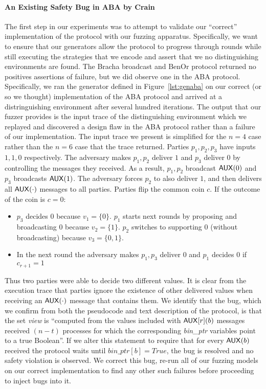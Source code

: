 \paragraph{An Existing Safety Bug in ABA by Crain~\cite{aba}}
The first step in our experiments was to attempt to validate our ``correct''
implementation of the protocol with our fuzzing apparatus.  Specifically, we
want to ensure that our generators allow the protocol to progress through
rounds while still executing the strategies that we encode and assert that we
no distinguishing environments are found.  The Bracha broadcast and BenOr
protocol returned no positives assertions of failure, but we did observe one in
the ABA protocol.  Specifically, we ran the generator defined in
Figure~\ref{lst:genaba} on our correct (or so we thought) implementation of the
ABA protocol and arrived at a distringuishing environment after several hundred
iterations.  The output that our fuzzer provides is the input trace of the
distinguishing environment which we replayed and discovered a design flaw in
the ABA protocol rather than a failure of our implementation.  The input trace
we present is simplified for the $n=4$ case rather than the $n=6$ case that the
trace returned.  Parties $p_1, p_2, p_3$ have inputs $1, 1, 0$ respectively.
The adversary makes $p_1, p_2$ deliver $1$ and $p_3$ deliver $0$ by controlling
the  messages they received.  As a result, $p_1, p_2$ broadcast
${\mathsf {AUX}}(0)$ and $p_3$ broadcasts ${\mathsf {AUX}}(1)$.  The adversary forces $p_2$
to also deliver $1$, and then delivers all ${\mathsf {AUX}}(\cdot)$ messages to all
parties.  Parties flip the common coin $c$. If the outcome of the coin is
$c=0$:
\begin{itemize}
    \item $p_3$ decides $0$ because $v_1 = \{0\}$. $p_1$ starts next rounds by
        proposing and broadcasting $0$ because $v_2 = \{1\}$. $p_2$ switches to
        supporting $0$ (without broadcasting) because $v_3 = \{0,1\}$. 
    \item In the next round the adversary makes $p_1,p_3$ deliver $0$ and $p_1$
        decides $0$ if $c_{r+1} = 1$ %
\end{itemize}
Thus two parties were able to decide two different values.  It is clear from
the execution trace that parties ignore the existence of other delivered values
when receiving an ${\mathsf {AUX}}(\cdot)$ message that contains them.  We identify
that the bug, which we confirm from both the pseudocode and text description of
the protocol, is that the set \emph{view} is ``computed from the values
included with ${\mathsf {AUX}}[r](b)$ messages received $(n-t)$ processes for which
the corresponding \emph{bin\_ptr} variables point to a true Boolean''.  If we
alter this statement to require that for every ${\mathsf {AUX}}(b)$ received the
protocol waits until $bin\_ptr[b] = True$, the bug is resolved and no safety
violation is observed.  We correct this bug, re-run all of our fuzzing models
on our correct implementation to find any other such failures before proceeding
to inject bugs into it.

